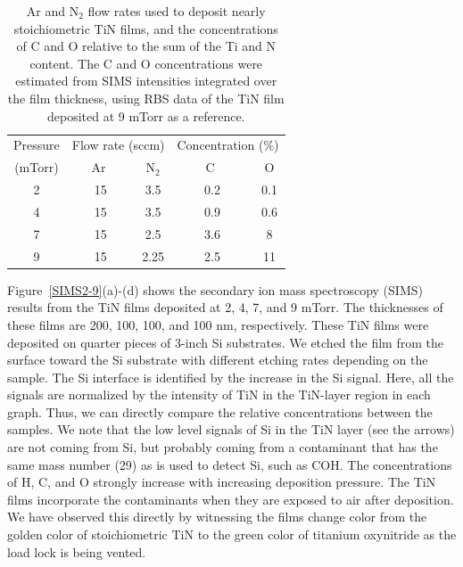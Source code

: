 \documentclass{report}
\begin{document}
\begin{table}
\caption{Ar and N$_{2}$ flow rates used to deposit nearly stoichiometric TiN films, and the concentrations of C and O relative to the sum of the Ti and N content. The C and O concentrations were estimated from SIMS intensities integrated over the film thickness, using RBS data of the TiN film deposited at  9 mTorr as a reference.}
\begin{tabular}{|c|c|c||c|c|}
\hline
\hline
Pressure & \multicolumn{2}{|c||}{Flow rate (sccm)} & \multicolumn{2}{|c|}{Concentration (\%)} \\
\cline{2-5}
 (mTorr) & \ \ \ Ar \ \ \ & N$_{2}$ & \ \ \ \ C \ \ \ \ & O \\
\hline
\hline
2 & 15 & 3.5 & 0.2 & 0.1 \\
\hline
4 & 15 & 3.5 & 0.9 & 0.6 \\
\hline
7 & 15 & 2.5 & 3.6 & 8 \\
\hline
9 & 15 & 2.25 & 2.5 & 11 \\
\hline
\hline
\end{tabular}
\label{TabContaminations}
\end{table}

Figure \,\ref{SIMS2-9}(a)-(d) shows the secondary ion mass spectroscopy (SIMS) results from the TiN films deposited at 2, 4, 7, and 9 mTorr. The thicknesses of these films are 200, 100, 100, and 100 nm, respectively. These TiN films were deposited on quarter pieces of 3-inch Si substrates. We etched the film from the surface toward the Si substrate with different etching rates depending on the sample. The Si interface is identified by the increase in the Si signal. Here, all the signals are normalized by the intensity of TiN in the TiN-layer region in each graph. Thus, we can directly compare the relative concentrations between the samples. We note that the low level signals of Si in the TiN layer (see the arrows) are not coming from Si, but probably coming from a contaminant that has the same mass number (29) as is used to detect Si, such as COH. The concentrations of H, C, and O strongly increase with increasing deposition pressure. The TiN films incorporate the contaminants when they are exposed to air after deposition.\cite{Logothetidis1999} We have observed this directly by witnessing the films change color from the golden color of stoichiometric TiN to the green color of titanium oxynitride as the load lock is being vented. 
\end{document}
